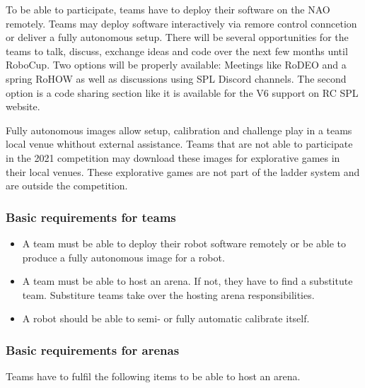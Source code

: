 To be able to participate, teams have to deploy their software on the NAO remotely. Teams may deploy software interactively via remore control conncetion or deliver a fully autonomous setup. There will be several opportunities for the teams to talk, discuss, exchange ideas and code over the next few months until RoboCup. Two options will be properly available: Meetings like RoDEO and a spring RoHOW as well as discussions using SPL Discord channels. The second option is a code sharing section like it is available for the V6 support on RC SPL website.

Fully autonomous images allow setup, calibration and challenge play in a teams local venue whithout external assistance. Teams that are not able to participate in the 2021 competition may download these images for explorative games in their local venues. These explorative games are not part of the ladder system and are outside the competition.

\subsubsection{Basic requirements for teams}
\label{sec:c3_BasicRequirementsForTeams}
\begin{itemize}
    \item A team must be able to deploy their robot software remotely or be able to produce a fully autonomous image for a robot.
    \item A team must be able to host an arena. If not, they have to find a substitute team. Substiture teams take over the hosting arena responsibilities.
    \item A robot should be able to semi- or fully automatic calibrate itself.
\end{itemize}

\subsubsection{Basic requirements for arenas}
\label{sec:c3_BasicRequirementsForArenas}
Teams have to fulfil the following items to be able to host an arena.

